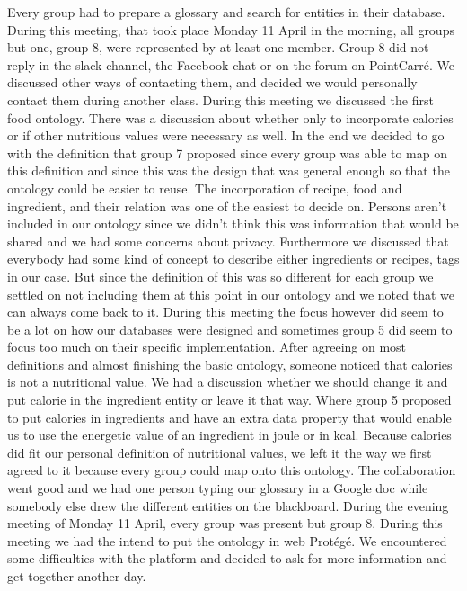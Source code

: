 Every group had to prepare a glossary and search for entities in their database. During this meeting, that took place Monday 11 April in the morning, all groups but one, group 8, were represented by at least one member. Group 8 did not reply in the slack-channel, the Facebook chat or on the forum on PointCarr\'e. We discussed other ways of contacting them, and decided we would personally contact them during another class. During this meeting we discussed the first food ontology. There was a discussion about whether only to incorporate calories or if other nutritious values were necessary as well. In the end we decided to go with the definition that group 7 proposed since every group was able to map on this definition and since this was the design that was general enough so that the ontology could be easier to reuse. The incorporation of recipe, food and ingredient, and their relation was one of the easiest to decide on. Persons aren't included in our ontology since we didn't think this was information that would be shared and we had some concerns about privacy. Furthermore we discussed that everybody had some kind of concept to describe either ingredients or recipes, tags in our case. But since the definition of this was so different for each group we settled on not including them at this point in our ontology and we noted that we can always come back to it. During this meeting the focus however did seem to be a lot on how our databases were designed and sometimes group 5 did seem to focus too much on their specific implementation. After agreeing on most definitions and almost finishing the basic ontology, someone noticed that calories is not a nutritional value. We had a discussion whether we should change it and put calorie in the ingredient entity or leave it that way. Where group 5 proposed to put calories in ingredients and have an extra data property that would enable us to use the energetic value of an ingredient in joule or in kcal. Because calories did fit our personal definition of nutritional values, we left it the way we first agreed to it because every group could map onto this ontology. The collaboration went good and we had one person typing our glossary in a Google doc while somebody else drew the different entities on the blackboard. 
\newline
\newline
\noindent
During the evening meeting of Monday 11 April, every group was present but group 8. During this meeting we had the intend to put the ontology in web Protégé. We encountered some difficulties with the platform and decided to ask for more information and get together another day. 
